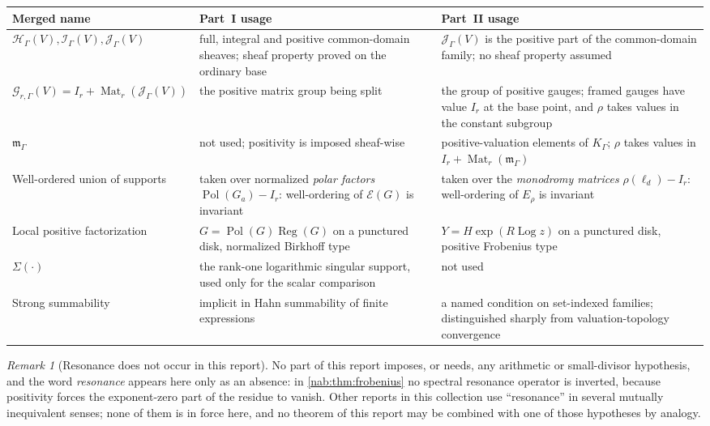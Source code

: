 \documentclass[11pt,letterpaper]{article}
\theoremstyle{definition}
\theoremstyle{remark}
\newtheorem{remark}[remark]{Remark}
\newcommand{\HH}{\mathscr H_\Gamma}
\newcommand{\II}{\mathscr I_\Gamma}
\newcommand{\JJ}{\mathscr J_\Gamma}
\newcommand{\GG}{\mathscr G_{r,\Gamma}}
\newcommand{\K}{K_\Gamma}
\newcommand{\mm}{\mathfrak m_\Gamma}
\newcommand{\Mat}{\operatorname{Mat}}
\newcommand{\Pol}{\operatorname{Pol}}
\newcommand{\Reg}{\operatorname{Reg}}
\newcommand{\Log}{\operatorname{Log}}
\newcommand{\EU}{\mathcal E}
\numberwithin{equation}{section}
\begin{document}
\begin{center}\small
\begin{tabular}{@{}L{0.26\textwidth}L{0.33\textwidth}L{0.33\textwidth}@{}}
\toprule
Merged name & Part~I usage & Part~II usage\\
\midrule
$\HH(V),\II(V),\JJ(V)$ & full, integral and positive common-domain sheaves;
sheaf property proved on the ordinary base &
$\JJ(V)$ is the positive part of the common-domain family; no sheaf property
assumed\\[0.35em]
$\GG(V)=I_r+\Mat_r(\JJ(V))$ & the positive matrix group being split &
the group of positive gauges; framed gauges have value $I_r$ at the base
point, and $\rho$ takes values in the constant subgroup\\[0.35em]
$\mm$ & not used; positivity is imposed sheaf-wise &
positive-valuation elements of $\K$; $\rho$ takes values in
$I_r+\Mat_r(\mm)$\\[0.35em]
Well-ordered union of supports & taken over normalized \emph{polar factors}
$\Pol(G_a)-I_r$: well-ordering of $\EU(G)$ is invariant &
taken over the \emph{monodromy matrices} $\rho(\ell_d)-I_r$: well-ordering of
$E_\rho$ is invariant\\[0.35em]
Local positive factorization & $G=\Pol(G)\Reg(G)$ on a punctured disk,
normalized Birkhoff type &
$Y=H\exp(R\Log z)$ on a punctured disk, positive Frobenius type\\[0.35em]
$\Sigma(\cdot)$ & the rank-one logarithmic singular support, used only for
the scalar comparison & not used\\[0.35em]
Strong summability & implicit in Hahn summability of finite expressions &
a named condition on set-indexed families; distinguished sharply from
valuation-topology convergence\\
\bottomrule
\end{tabular}
\end{center}

\begin{remark}[Resonance does not occur in this report]
\label{nab:rem:resonance}
No part of this report imposes, or needs, any arithmetic or small-divisor
hypothesis,
and the word \emph{resonance} appears here only as an absence: in
\cref{nab:thm:frobenius} no spectral resonance operator is inverted, because
positivity forces the exponent-zero part of the residue to vanish. Other
reports in this collection use ``resonance'' in several mutually inequivalent
senses; none of them is in force here, and no theorem of this report may be
combined with one of those hypotheses by analogy.
\end{remark}
\end{document}
